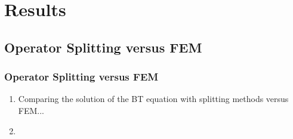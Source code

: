 \section{Results}

\subsection{Operator Splitting versus FEM}

\begin{frame}
\frametitle{Operator Splitting versus FEM}
\begin{enumerate}
    \item Comparing the solution of the BT equation with splitting methods versus FEM...
    \item {} %
\end{enumerate}
\end{frame}


